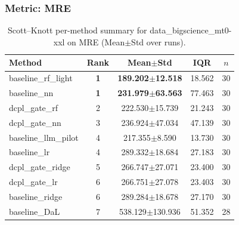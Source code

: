 \subsubsection*{Metric: MRE}
\begin{table}[H]
\centering
\scriptsize
\setlength{\tabcolsep}{4pt}
\renewcommand{\arraystretch}{1.1}
\caption{Scott--Knott per-method summary for data\_bigscience\_mt0-xxl on MRE (Mean$\pm$Std over runs).}
\label{tab:sk_data_bigscience_mt0-xxl_MRE}
\begin{tabular}{l|c|c|c|c}
\hline
\textbf{Method} & \textbf{Rank} & \textbf{Mean$\pm$Std} & \textbf{IQR} & \textbf{$n$} \\
\hline
\rowcolor{red!15} baseline\_rf\_light & \textbf{1} & \textbf{189.202$\pm$12.518} & 18.562 & 30 \\
\rowcolor{red!15} baseline\_nn & \textbf{1} & \textbf{231.979$\pm$63.563} & 77.463 & 30 \\
dcpl\_gate\_rf & 2 & 222.530$\pm$15.739 & 21.243 & 30 \\
dcpl\_gate\_nn & 3 & 236.924$\pm$47.034 & 47.139 & 30 \\
baseline\_llm\_pilot & 4 & 217.355$\pm$8.590 & 13.730 & 30 \\
baseline\_lr & 4 & 289.332$\pm$18.684 & 27.183 & 30 \\
dcpl\_gate\_ridge & 5 & 266.747$\pm$27.071 & 23.400 & 30 \\
dcpl\_gate\_lr & 6 & 266.751$\pm$27.078 & 23.403 & 30 \\
baseline\_ridge & 6 & 289.284$\pm$18.678 & 27.170 & 30 \\
baseline\_DaL & 7 & 538.129$\pm$130.936 & 51.352 & 28 \\
\hline
\end{tabular}
\end{table}
